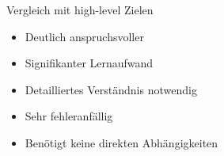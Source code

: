 \begin{frame}{Vergleich mit high-level Zielen}
	\begin{itemize}
		\item Deutlich anspruchsvoller
		\item Signifikanter Lernaufwand
		\item Detailliertes Verständnis notwendig
		\item Sehr fehleranfällig
		\item Benötigt keine direkten Abhängigkeiten
	\end{itemize}
\end{frame}
